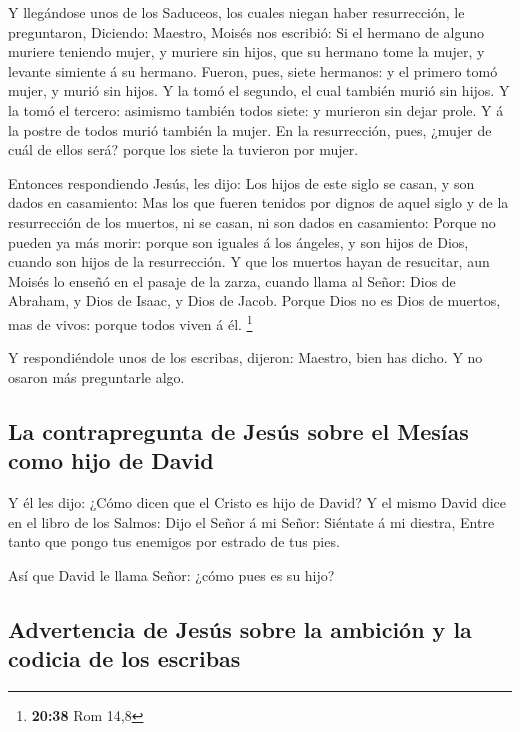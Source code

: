  Y llegándose unos de los Saduceos, los cuales niegan
haber resurrección, le preguntaron,  Diciendo: Maestro,
Moisés nos escribió: Si el hermano de alguno muriere teniendo mujer, y
muriere sin hijos, que su hermano tome la mujer, y levante simiente á su
hermano.  Fueron, pues, siete hermanos: y el primero tomó
mujer, y murió sin hijos.  Y la tomó el segundo, el cual
también murió sin hijos.  Y la tomó el tercero: asimismo
también todos siete: y murieron sin dejar prole.  Y á la
postre de todos murió también la mujer.  En la
resurrección, pues, ¿mujer de cuál de ellos será? porque los siete la
tuvieron por mujer.

 Entonces respondiendo Jesús, les dijo: Los hijos de este
siglo se casan, y son dados en casamiento:  Mas los que
fueren tenidos por dignos de aquel siglo y de la resurrección de los
muertos, ni se casan, ni son dados en casamiento:  Porque
no pueden ya más morir: porque son iguales á los ángeles, y son hijos de
Dios, cuando son hijos de la resurrección.  Y que los
muertos hayan de resucitar, aun Moisés lo enseñó en el pasaje de la
zarza, cuando llama al Señor: Dios de Abraham, y Dios de Isaac, y Dios
de Jacob.  Porque Dios no es Dios de muertos, mas de
vivos: porque todos viven á él. \footnote{\textbf{20:38} Rom 14,8}

 Y respondiéndole unos de los escribas, dijeron: Maestro,
bien has dicho.  Y no osaron más preguntarle algo.

\hypertarget{la-contrapregunta-de-jesuxfas-sobre-el-mesuxedas-como-hijo-de-david}{%
\subsection{La contrapregunta de Jesús sobre el Mesías como hijo de
David}\label{la-contrapregunta-de-jesuxfas-sobre-el-mesuxedas-como-hijo-de-david}}

 Y él les dijo: ¿Cómo dicen que el Cristo es hijo de
David?  Y el mismo David dice en el libro de los Salmos:
Dijo el Señor á mi Señor: Siéntate á mi diestra,  Entre
tanto que pongo tus enemigos por estrado de tus pies.

 Así que David le llama Señor: ¿cómo pues es su hijo?

\hypertarget{advertencia-de-jesuxfas-sobre-la-ambiciuxf3n-y-la-codicia-de-los-escribas}{%
\subsection{Advertencia de Jesús sobre la ambición y la codicia de los
escribas}\label{advertencia-de-jesuxfas-sobre-la-ambiciuxf3n-y-la-codicia-de-los-escribas}}

